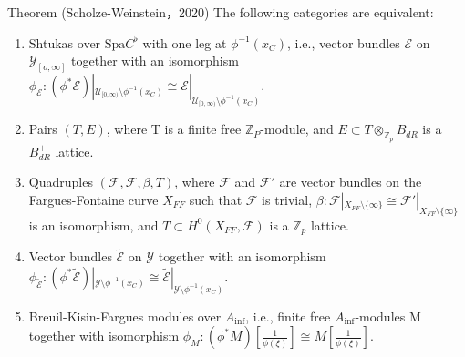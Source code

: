 \documentclass[aspectratio=1610]{ctexbeamer}
\def  \Spa      {\mathrm{Spa}}
\def  \ce       {\mathcal{E}}
\def  \cf       {\mathcal{F}}
\def  \cu       {\mathcal{U}}
\def  \cy       {\mathcal{Y}}
\def  \bz       {\mathbb{Z}}
\begin{document}
\begin{frame}
\begin{alertblock}{Theorem (Scholze-Weinstein，2020)}
	The following categories are equivalent:
	\begin{enumerate}
		\item Shtukas over $\Spa C^{\flat}$  with one leg at $\phi^{-1}(x_C)$, i.e., vector bundles $\ce$ on $\cy_{[o, \infty]}$ together with an isomorphism $\phi_{\ce}: (\phi^* \ce)|_{\cu_{[0, \infty)}\setminus \phi^{-1}(x_C)} \cong  \ce|_{\cu_{[0, \infty)}\setminus \phi^{-1}(x_C)}$.
		\item Pairs $(T, E)$, where T is a finite free $\bz_P$-module, and $E \subset  T\otimes _{\bz_p} B_{dR}$ is a $B^+_{dR}$ lattice.
		\item  Quadruples $(\cf, \cf,\beta, T)$, where $\cf$ and $\cf'$ are vector bundles on the Fargues-Fontaine curve $X_{FF}$ such that $\cf$ is trivial, $\beta: \cf|_{X_{FF}\setminus \{ \infty\}} \cong \cf'|_{X_{FF}\setminus \{ \infty\}}$  is an isomorphism, and $T \subset H^0(X_{FF} ,\cf)$ is a $\bz_p$ lattice.
		\item Vector bundles $\widetilde{\ce}$ on $\cy$ together with an isomorphism $\phi_{\widetilde{\ce}}: (\phi^* \widetilde{\ce})|_{\cy \setminus \phi^{-1}(x_C)} \cong  \widetilde{\ce}|_{\cy \setminus \phi^{-1}(x_C)}$.
		\item  Breuil-Kisin-Fargues modules over $A_{\inf}$, i.e., finite free $A_{\inf}$-modules M together with isomorphism $\phi_M: (\phi^* M)[\frac{1}{\phi(\xi)}] \cong M[\frac{1}{\phi(\xi)}]$.
	\end{enumerate}
\end{alertblock}

\end{frame}
\end{document}

